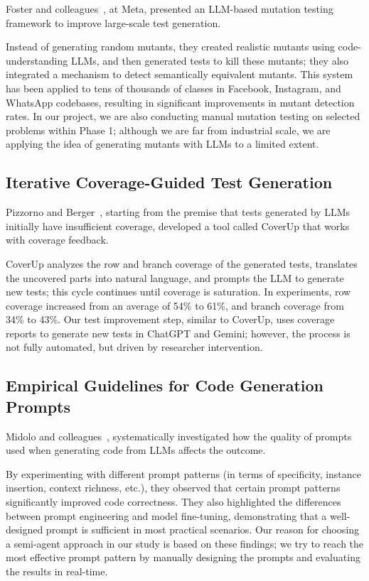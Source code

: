 Foster and colleagues~\cite{foster2025mutation}, at Meta, presented an LLM-based mutation testing framework to improve large-scale test generation.

Instead of generating random mutants, they created realistic mutants using code-understanding LLMs, and then generated tests to kill these mutants; they also integrated a mechanism to detect semantically equivalent mutants. This system has been applied to tens of thousands of classes in Facebook, Instagram, and WhatsApp codebases, resulting in significant improvements in mutant detection rates. In our project, we are also conducting manual mutation testing on selected problems within Phase 1; although we are far from industrial scale, we are applying the idea of generating mutants with LLMs to a limited extent.

\subsection{Iterative Coverage-Guided Test Generation}

Pizzorno and Berger~\cite{pizzorno2024coverup}, starting from the premise that tests generated by LLMs initially have insufficient coverage, developed a tool called CoverUp that works with coverage feedback.

CoverUp analyzes the row and branch coverage of the generated tests, translates the uncovered parts into natural language, and prompts the LLM to generate new tests; this cycle continues until coverage is saturation. In experiments, row coverage increased from an average of 54\% to 61\%, and branch coverage from 34\% to 43\%.
Our test improvement step, similar to CoverUp, uses coverage reports to generate new tests in ChatGPT and Gemini; however, the process is not fully automated, but driven by researcher intervention.

\subsection{Empirical Guidelines for Code Generation Prompts}

Midolo and colleagues~\cite{midolo2026guidelines}, systematically investigated how the quality of prompts used when generating code from LLMs affects the outcome.

By experimenting with different prompt patterns (in terms of specificity, instance insertion, context richness, etc.), they observed that certain prompt patterns significantly improved code correctness.
They also highlighted the differences between prompt engineering and model fine-tuning, demonstrating that a well-designed prompt is sufficient in most practical scenarios.
Our reason for choosing a semi-agent approach in our study is based on these findings; we try to reach the most effective prompt pattern by manually designing the prompts and evaluating the results in real-time.

